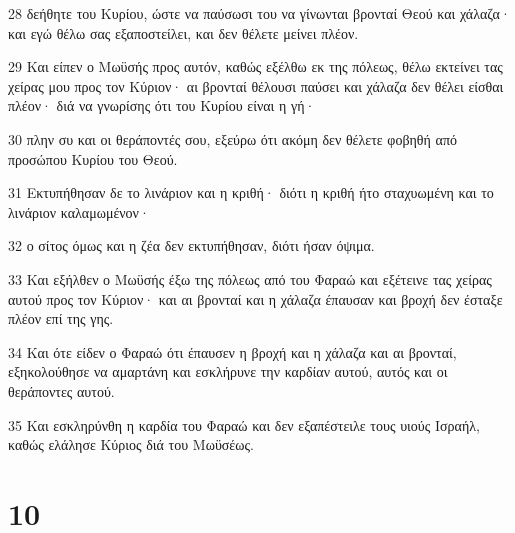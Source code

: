 \par 28 δεήθητε του Κυρίου, ώστε να παύσωσι του να γίνωνται βρονταί Θεού και χάλαζα· και εγώ θέλω σας εξαποστείλει, και δεν θέλετε μείνει πλέον.
\par 29 Και είπεν ο Μωϋσής προς αυτόν, καθώς εξέλθω εκ της πόλεως, θέλω εκτείνει τας χείρας μου προς τον Κύριον· αι βρονταί θέλουσι παύσει και χάλαζα δεν θέλει είσθαι πλέον· διά να γνωρίσης ότι του Κυρίου είναι η γή·
\par 30 πλην συ και οι θεράποντές σου, εξεύρω ότι ακόμη δεν θέλετε φοβηθή από προσώπου Κυρίου του Θεού.
\par 31 Εκτυπήθησαν δε το λινάριον και η κριθή· διότι η κριθή ήτο σταχυωμένη και το λινάριον καλαμωμένον·
\par 32 ο σίτος όμως και η ζέα δεν εκτυπήθησαν, διότι ήσαν όψιμα.
\par 33 Και εξήλθεν ο Μωϋσής έξω της πόλεως από του Φαραώ και εξέτεινε τας χείρας αυτού προς τον Κύριον· και αι βρονταί και η χάλαζα έπαυσαν και βροχή δεν έσταξε πλέον επί της γης.
\par 34 Και ότε είδεν ο Φαραώ ότι έπαυσεν η βροχή και η χάλαζα και αι βρονταί, εξηκολούθησε να αμαρτάνη και εσκλήρυνε την καρδίαν αυτού, αυτός και οι θεράποντες αυτού.
\par 35 Και εσκληρύνθη η καρδία του Φαραώ και δεν εξαπέστειλε τους υιούς Ισραήλ, καθώς ελάλησε Κύριος διά του Μωϋσέως.

\chapter{10}

